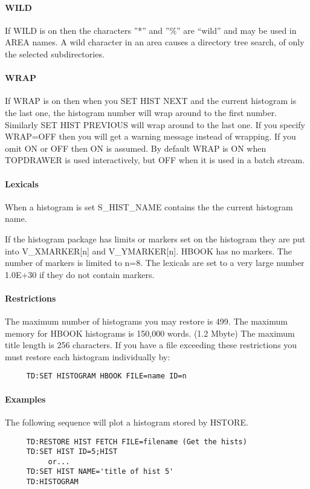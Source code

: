 \paragraph{WILD}
If  WILD  is on then the characters ''*'' and ''\%'' are ``wild'' and may be
used in AREA names.  A wild character in an area causes  a  directory
tree search, of only the selected subdirectories.  
\paragraph{WRAP}
If  WRAP  is on then when you SET HIST NEXT and the current histogram
is the last one, the histogram number will wrap around to  the  first
number.   Similarly  SET HIST PREVIOUS  will  wrap around to the last
one.  If you specify WRAP=OFF then you will  get  a  warning  message
instead  of  wrapping.  If you omit ON or OFF then ON is assumed.  By
default WRAP is ON when TOPDRAWER is used interactively, but OFF when
it is used in a batch stream.  
\paragraph{Lexicals}
When  a  histogram  is  set  S\_HIST\_NAME  contains  the  the  current
histogram name.  

If  the  histogram package has limits or markers set on the histogram
they are put  into  V\_XMARKER[n]  and  V\_YMARKER[n].   HBOOK  has  no
markers.   The number of markers is limited to n=8.  The lexicals are
set to a very large number 1.0E+30 if they do not contain markers.  
\paragraph{Restrictions}
The maximum number of histograms you may restore is 499.  The maximum
memory for  HBOOK  histograms  is  150,000  words.   (1.2 Mbyte)  The
maximum title length is 256 characters.  If you have a file exceeding
these restrictions you must restore each histogram individually by:  
\begin{verbatim}
     TD:SET HISTOGRAM HBOOK FILE=name ID=n 
\end{verbatim}
\paragraph{Examples}
The following sequence will plot a histogram stored by HSTORE.  
\begin{verbatim}
     TD:RESTORE HIST FETCH FILE=filename (Get the hists) 
     TD:SET HIST ID=5;HIST 
          or...  
     TD:SET HIST NAME='title of hist 5' 
     TD:HISTOGRAM 
\end{verbatim}

